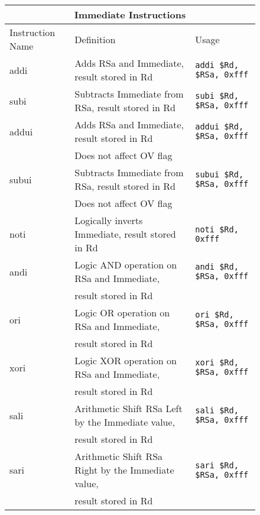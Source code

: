 \documentclass[letterpaper, 11pt]{article}
\begin{document}
\begin{figure}[!h]
	\begin{center}
		\begin{tabular}{|l|l|l|}
			\hline
			\multicolumn{3}{c}{Immediate Instructions} \\ \hline
			Instruction Name	& Definition															& Usage 							\\ \hline
			addi				& Adds RSa and Immediate, result stored in Rd							& \texttt{addi \$Rd, \$RSa, 0xfff}	\\ \hline
			subi				& Subtracts Immediate from RSa, result stored in Rd						& \texttt{subi \$Rd, \$RSa, 0xfff}	\\ \hline
			addui 				& Adds RSa and Immediate, result stored in Rd 							& \texttt{addui \$Rd, \$RSa, 0xfff}	\\ 
			\hfill				& Does not affect OV flag												& \hfill 							\\ \hline
			subui 				& Subtracts Immediate from RSa, result stored in Rd						& \texttt{subui \$Rd, \$RSa, 0xfff}	\\ 
			\hfill				& Does not affect OV flag												& \hfill 							\\ \hline
			noti				& Logically inverts Immediate, result stored in Rd						& \texttt{noti \$Rd, 	0xfff}		\\ \hline
			andi				& Logic AND operation on RSa and Immediate, 							& \texttt{andi \$Rd, \$RSa, 0xfff}	\\ 
			\hfill				& result stored in Rd													& \hfill 							\\ \hline	
			ori					& Logic OR operation on RSa and Immediate, 								& \texttt{ori \$Rd, \$RSa, 0xfff}	\\ 
			\hfill				& result stored in Rd													& \hfill 							\\ \hline		
			xori				& Logic XOR operation on RSa and Immediate, 							& \texttt{xori \$Rd, \$RSa, 0xfff}	\\ 
			\hfill				& result stored in Rd													& \hfill 							\\ \hline					
			sali				& Arithmetic Shift RSa Left by the Immediate value,						& \texttt{sali \$Rd, \$RSa, 0xfff}	\\ 	
			\hfill				& result stored in Rd													& \hfill 							\\ \hline				
			sari				& Arithmetic Shift RSa Right by the Immediate value,					& \texttt{sari \$Rd, \$RSa, 0xfff}	\\ 	
			\hfill				& result stored in Rd													& \hfill 							\\ \hline				

\end{tabular}
\end{center}
\end{figure}
\end{document}

